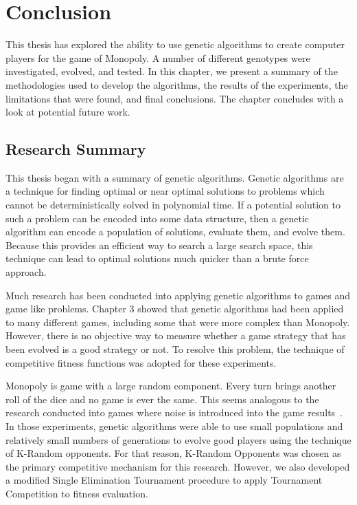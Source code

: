 \clearpage
\chapter{Conclusion}\label{chap:conclusion}

This thesis has explored the ability to use genetic algorithms to create
computer players for the game of Monopoly. A number of different genotypes were
investigated, evolved, and tested. In this chapter, we present a summary of the
methodologies used to develop the algorithms, the results of the experiments,
the limitations that were found, and final conclusions. The chapter concludes
with a look at potential future work.

\section{Research Summary}

This thesis began with a summary of genetic algorithms. Genetic algorithms are a
technique for finding optimal or near optimal solutions to problems which cannot
be deterministically solved in polynomial time. If a potential solution to such
a problem can be encoded into some data structure, then a genetic algorithm can
encode a population of solutions, evaluate them, and evolve them. Because this
provides an efficient way to search a large search space, this technique can
lead to optimal solutions much quicker than a brute force approach.

Much research has been conducted into  applying genetic algorithms to games and
game like problems. Chapter 3 showed that genetic algorithms had been applied to
many different games, including some that were more complex than Monopoly.
However, there is no objective way to measure whether a game strategy that has
been evolved is a good strategy or not. To resolve this problem, the technique
of competitive fitness functions was adopted for these experiments.

Monopoly is game with a large random component. Every turn brings another roll
of the dice and no game is ever the same. This seems analogous to the research
conducted into games where noise is introduced into the game
results~\cite{Panait02acomparative}. In those experiments, genetic algorithms
were able to use small populations and relatively small numbers of generations
to evolve good players using the technique of K-Random opponents. For that
reason, K-Random Opponents was chosen as the primary competitive mechanism for
this research. However, we also developed a modified Single Elimination
Tournament procedure to apply Tournament Competition to fitness evaluation.

